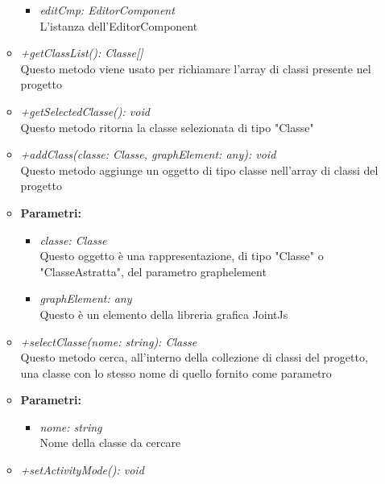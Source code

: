 \begin{itemize}
\begin{itemize}
            				\begin{itemize}
            					\item \emph{editCmp: EditorComponent}\\
            					L'istanza dell'EditorComponent
            				\end{itemize}
          				\item \emph{+getClassList(): Classe[]}\\
          				Questo metodo viene usato per richiamare l'array di classi presente nel progetto
          				\item \emph{+getSelectedClasse(): void}\\
          				Questo metodo ritorna la classe selezionata di tipo "Classe"
          				\item \emph{+addClass(classe: Classe, graphElement: any): void}\\
          				Questo metodo aggiunge un oggetto di tipo classe nell'array di classi del progetto
          				\item \textbf{Parametri:}\\
            				\begin{itemize}
            					\item \emph{classe: Classe}\\
            					Questo oggetto è una rappresentazione, di tipo "Classe" o "ClasseAstratta", del parametro graphelement
            					\item \emph{graphElement: any}\\
            					Questo è un elemento della libreria grafica JointJs
            				\end{itemize}
          				\item \emph{+selectClasse(nome: string): Classe}\\
          				Questo metodo cerca, all'interno della collezione di classi del progetto, una classe con lo stesso nome di quello fornito come parametro
          				\item \textbf{Parametri:}\\
            				\begin{itemize}
            					\item \emph{nome: string}\\
            					Nome della classe da cercare
            				\end{itemize}
          				\item \emph{+setActivityMode(): void}\\

\end{itemize}
\end{itemize}
